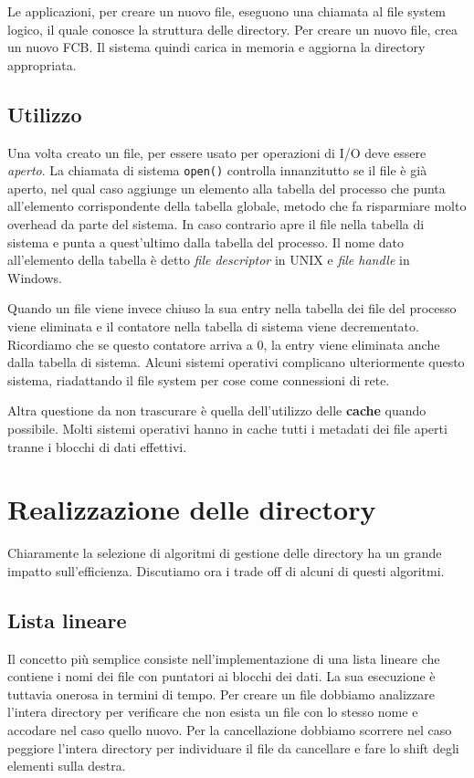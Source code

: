         Le applicazioni, per creare un nuovo file, eseguono una chiamata al file system logico, il quale conosce la struttura delle directory. Per creare un nuovo file, crea un nuovo FCB. Il sistema quindi carica in memoria e aggiorna la directory appropriata.
        
    \subsection{Utilizzo}
        Una volta creato un file, per essere usato per operazioni di I/O deve essere \textit{aperto}. La chiamata di sistema \texttt{open()} controlla innanzitutto se il file è già aperto, nel qual caso aggiunge un elemento alla tabella del processo che punta all'elemento corrispondente della tabella globale, metodo che fa risparmiare molto overhead da parte del sistema. In caso contrario apre il file nella tabella di sistema e punta a quest'ultimo dalla tabella del processo. Il nome dato all'elemento della tabella è detto \textit{file descriptor} in UNIX e \textit{file handle} in Windows.
        
        Quando un file viene invece chiuso la sua entry nella tabella dei file del processo viene eliminata e il contatore nella tabella di sistema viene decrementato. Ricordiamo che se questo contatore arriva a 0, la entry viene eliminata anche dalla tabella di sistema. Alcuni sistemi operativi complicano ulteriormente questo sistema, riadattando il file system per cose come connessioni di rete.
        
        Altra questione da non trascurare è quella dell'utilizzo delle \textbf{cache} quando possibile. Molti sistemi operativi hanno in cache tutti i metadati dei file aperti tranne i blocchi di dati effettivi.
        
\section{Realizzazione delle directory}
    Chiaramente la selezione di algoritmi di gestione delle directory ha un grande impatto sull'efficienza. Discutiamo ora i trade off di alcuni di questi algoritmi.
    
    \subsection{Lista lineare}
        Il concetto più semplice consiste nell'implementazione di una lista lineare che contiene i nomi dei file con puntatori ai blocchi dei dati. La sua esecuzione è tuttavia onerosa in termini di tempo. Per creare un file dobbiamo analizzare l'intera directory per verificare che non esista un file con lo stesso nome e accodare nel caso quello nuovo. Per la cancellazione dobbiamo scorrere nel caso peggiore l'intera directory per individuare il file da cancellare e fare lo shift degli elementi sulla destra.
        
